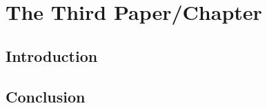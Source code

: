 \chapter{The Third Paper/Chapter}

\section{Introduction}
\lipsum[1-4]

\section{Conclusion}
\lipsum[5-8]